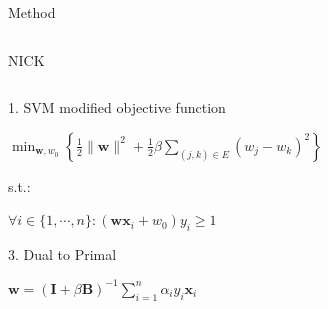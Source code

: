 \documentclass[final]{beamer} %
\begin{document}
\begin{frame}{}
\begin{block}{Method}
\begin{columns}
      \begin{column}{0.3\textwidth}
        \begin{block}{NICK}
          \begin{columns}
            \begin{column}{0.5\textwidth}
              
              \begin{block}{\tiny{1. SVM modified objective function}}
                \tiny
                \begin{center}
                  $\min_{\mathbf{w}, w_0}\left\{\frac{1}{2}\|\mathbf{w}\|^2 + \frac{1}{2}\beta\sum_{(j,k)\in E}(w_j-w_k)^2\right\}$
                \end{center}
                s.t.:
                \begin{center}
                  $\forall i \in \{1,\cdots,n\} : (\mathbf{w}\mathbf{x}_i+w_0)y_i\geq 1$
                \end{center}
              \end{block}
              
              \begin{block}{\tiny{3. Dual to Primal}}
                \tiny
                \begin{center}
                  $\mathbf{w} = (\mathbf{I} + \beta \mathbf{B})^{-1} \sum_{i = 1}^n \alpha_i y_i \mathbf{x}_i$
                \end{center}
              \end{block}
            \end{column}
            

\end{columns}
\end{block}
\end{column}
\end{columns}
\end{block}
\end{frame}
\end{document}
